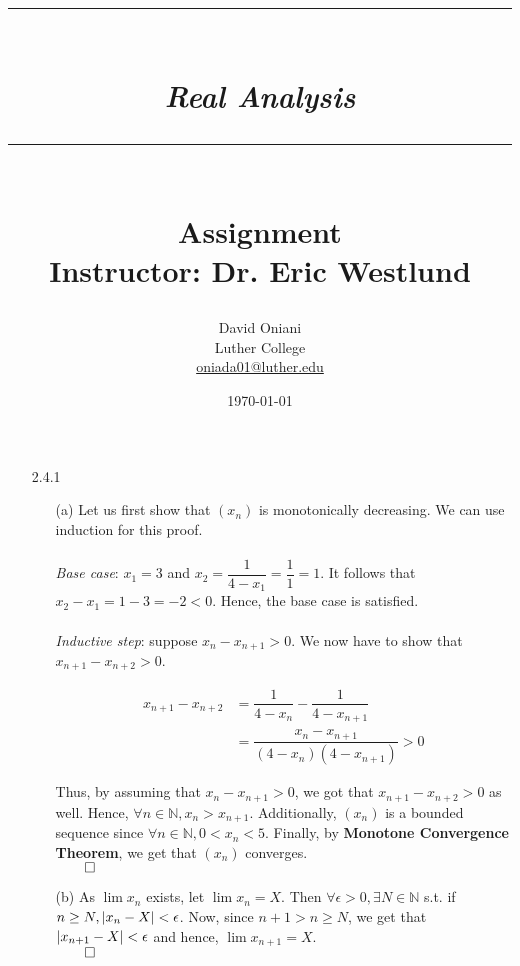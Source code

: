 \documentclass[11pt]{article}
\author{David Oniani\\
        Luther College\\
        \href{mailto:oniada01@luther.edu}{oniada01@luther.edu}}
\title{\rule{\paperwidth - 150pt}{1pt}\textbf{\\\textit{Real Analysis}\\}\rule
{\paperwidth - 150pt}{1pt}\\\textbf{Assignment \textnumero3}\\{\normalsize
Instructor: Dr. Eric Westlund}}
\date{\today}
\DeclarePairedDelimiter\abs{\lvert}{\rvert}%
\newcommand{\nats}{\mathbb{N}}
\begin{document}
\maketitle

%
%
%

\begin{itemize}
    \item[2.4.1]
        \begin{itemize}
            \item[(a)]
                Let us first show that $(x_n)$ is monotonically decreasing. We
                can use induction for this proof.
                \\\\
                \textit{Base case}: $x_1 = 3$ and $x_2 = \dfrac{1}{4 - x_1} =
                \dfrac{1}{1} = 1$.  It follows that $x_2 - x_1 = 1 - 3 = -2 <
                0$. Hence, the base case is satisfied.
                \\\\
                \textit{Inductive step}: suppose $x_n - x_{n + 1} > 0$. We now
                have to show that $x_{n + 1} - x_{n + 2} > 0$.

                \begin{align*}
                    x_{n + 1} - x_{n + 2} & = \dfrac{1}{4 - x_n} -
                        \dfrac{1}{4 - x_{n + 1}}\\
                                          & = \dfrac{x_n -x_{n + 1}}{(4 -
                                              x_n)(4 - x_{n + 1})} > 0
                \end{align*}

                Thus, by assuming that $x_n - x_{n + 1} > 0$, we got that $x_{n
                + 1} - x_{n + 2} > 0$ as well. Hence, $\forall n \in \nats, x_n
                > x_{n + 1}$. Additionally, $(x_n)$ is a bounded sequence since
                $\forall n \in \nats, 0 < x_n < 5$. Finally, by
                \textbf{Monotone Convergence Theorem}, we get that $(x_n)$
                converges.\\
                $\qed$

            \item[(b)]
                As $\lim{x_n}$ exists, let $\lim{x_n} = X$. Then $\forall
                \epsilon > 0, \exists N \in \nats$ s.t. if $n \geq N, \abs{x_n
                - X} < \epsilon$. Now, since $n + 1 > n \geq N$, we get that
                $\abs{x_{n + 1} - X} < \epsilon$ and hence, $\lim{x_{n + 1}} =
                X$.\\
                $\qed$


\end{itemize}
\end{itemize}
\end{document}
